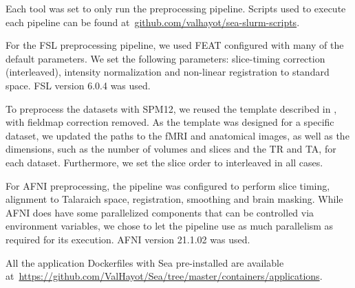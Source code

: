     Each tool was set to only run the preprocessing pipeline. Scripts used to
    execute each pipeline can be found
    at~\url{github.com/valhayot/sea-slurm-scripts}.
    
    For the FSL preprocessing pipeline, we used FEAT configured with many of
    the default parameters. We set the following parameters: slice-timing
    correction (interleaved), intensity normalization and non-linear
    registration to standard space. FSL version 6.0.4 was used.
    
    To preprocess the datasets with SPM12, we reused the template described in
    \cite{haitas2021age}, with fieldmap correction removed. As the template was
    designed for a specific dataset, we updated the paths to the fMRI and
    anatomical images, as well as the dimensions, such as the number of volumes
    and slices and the TR and TA, for each dataset. Furthermore, we set the
    slice order to interleaved in all cases. 
    
    For AFNI preprocessing, the pipeline was configured to perform slice timing,
    alignment to Talaraich space, registration, smoothing and brain masking.
    While AFNI does have some parallelized components that can be controlled via
    environment variables, we chose to let the pipeline use as much parallelism
    as required for its execution. AFNI version 21.1.02 was used.

    All the application Dockerfiles with Sea pre-installed are available
    at~\url{https://github.com/ValHayot/Sea/tree/master/containers/applications}.
    

    
